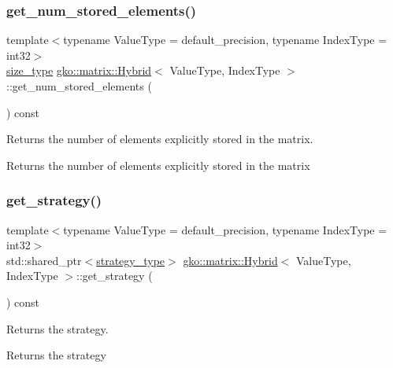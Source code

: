 \subsubsection{\texorpdfstring{get\+\_\+num\+\_\+stored\+\_\+elements()}{get\_num\_stored\_elements()}}
{\footnotesize\ttfamily template$<$typename Value\+Type = default\+\_\+precision, typename Index\+Type = int32$>$ \\
\hyperlink{namespacegko_a6e5c95df0ae4e47aab2f604a22d98ee7}{size\+\_\+type} \hyperlink{classgko_1_1matrix_1_1Hybrid}{gko\+::matrix\+::\+Hybrid}$<$ Value\+Type, Index\+Type $>$\+::get\+\_\+num\+\_\+stored\+\_\+elements (\begin{DoxyParamCaption}{ }\end{DoxyParamCaption}) const\hspace{0.3cm}{\ttfamily [noexcept]}}



Returns the number of elements explicitly stored in the matrix. 

\begin{DoxyReturn}{Returns}
the number of elements explicitly stored in the matrix 
\end{DoxyReturn}
\mbox{\label{classgko_1_1matrix_1_1Hybrid_a8be764050176291d35e7b4dee1b6e1bc}} 
\subsubsection{\texorpdfstring{get\+\_\+strategy()}{get\_strategy()}}
{\footnotesize\ttfamily template$<$typename Value\+Type = default\+\_\+precision, typename Index\+Type = int32$>$ \\
std\+::shared\+\_\+ptr$<$\hyperlink{classgko_1_1matrix_1_1Hybrid_1_1strategy__type}{strategy\+\_\+type}$>$ \hyperlink{classgko_1_1matrix_1_1Hybrid}{gko\+::matrix\+::\+Hybrid}$<$ Value\+Type, Index\+Type $>$\+::get\+\_\+strategy (\begin{DoxyParamCaption}{ }\end{DoxyParamCaption}) const\hspace{0.3cm}{\ttfamily [noexcept]}}



Returns the strategy. 

\begin{DoxyReturn}{Returns}
the strategy 
\end{DoxyReturn}
\mbox{\label{classgko_1_1matrix_1_1Hybrid_a401af55be629372e3114b67df6fc4d04}} 
